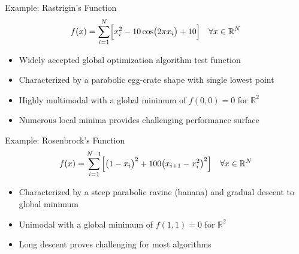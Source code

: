 \documentclass[
	style=aggie,
	mode=present,
	size=10pt,
	paper=screen,
	orient=landscape,
	display=slides,
]{powerdot}
\begin{document}
\begin{wideslide}[toc=Rastrigin,bm=Rastrigrin]{Example: Rastrigin's Function}
	\vfill
	\begin{equation*}
 		f(x) = \sum_{i=1}^{N}\Bigl[x_{i}^2-10\cos\bigl(2\pi x_i\bigr)+10\Bigr]\quad
		\forall x \in \mathbb{R}^N
	\end{equation*}
	\vfill
	\centering
	\begin{figure}[htbp]
	\end{figure}
	\vfill
	\begin{itemize}
 		\item Widely accepted global optimization algorithm test function
  		\vspace{1mm}
 		\item Characterized by a parabolic egg-crate shape with single lowest point
		\vspace{1mm} 
 		\item Highly multimodal with a global minimum of $f(0,0) = 0$ for $\mathbb{R}^2$
		\vspace{1mm}
		\item Numerous local minima provides challenging performance surface
	\end{itemize}
	\vfill \strut
\end{wideslide}

\begin{wideslide}[toc=Rosenbrock,bm=Rosenbrock]{Example: Rosenbrock's Function}
	\vfill
	\begin{equation*}
 		f(x) = \sum_{i=1}^{N-1}\Bigl[\bigl(1-x_i\bigr)^2+ 100 \bigl(x_{i+1} - x_i^2
		\bigr)^2\Bigr]\quad \forall x \in \mathbb{R}^N
	\end{equation*}
	\vfill
	\centering
	\begin{figure}[htbp]
	\end{figure}
	\vfill
	\begin{itemize}
 		\item Characterized by a steep parabolic ravine (banana) and gradual descent to
		global minimum
		\vspace{1mm} 
 		\item Unimodal with a global minimum of $f(1,1) = 0$ for $\mathbb{R}^2$
		\vspace{1mm}
		\item Long descent proves challenging for most algorithms
	\end{itemize}
	\vfill \strut
\end{wideslide}
\end{document}
